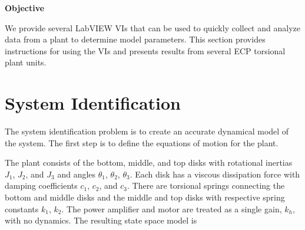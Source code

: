
\begin{center}  \textbf{Objective}
\end{center}
We provide several LabVIEW VIs that can be used to quickly collect
and analyze data from a plant to determine model parameters.  This
section provides instructions for using the VIs and presents results
from several ECP torsional plant units.


\section{System Identification}

The system identification problem is to create an accurate dynamical
model of the system.  The first step is to define the equations of
motion for the plant.

The plant consists of the bottom, middle, and top disks with
rotational inertias $J_1$, $J_2$, and $J_3$ and angles $\theta_1$,
$\theta_2$, $\theta_3$. Each disk has a viscous dissipation force with
damping coefficients $c_1$, $c_2$, and $c_3$.  There are torsional
springs connecting the bottom and middle disks and the middle and top
disks with respective spring constants $k_1$, $k_2$.  The power
amplifier and motor are treated as a single gain, $k_{h}$, with no
dynamics.  The resulting state space model is


